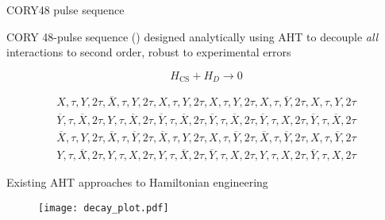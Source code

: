 \documentclass{beamer}
\begin{document}
\begin{frame}{CORY48 pulse sequence}
%

CORY 48-pulse sequence (\cite{CORY1990205}) designed analytically using AHT to decouple \emph{all} interactions to second order, robust to experimental errors

\[
H_{\text{CS}} + H_D \longrightarrow 0
\]

\begin{equation*}\label{eq:CORY48}
\begin{aligned}
    X, \tau, Y, 2\tau, \overline{X}, \tau, Y, 2\tau, X, \tau, Y, 2\tau,
    X, \tau, Y, 2\tau, X, \tau, \overline{Y}, 2\tau, X, \tau, Y, 2\tau \\
    \overline{Y}, \tau, \overline{X}, 2\tau, Y, \tau, \overline{X}, 2\tau,
    \overline{Y}, \tau, \overline{X}, 2\tau, \overline{Y}, \tau, \overline{X},
    2\tau, \overline{Y}, \tau, X, 2\tau, \overline{Y}, \tau, \overline{X},
    2\tau \\
    \overline{X}, \tau, Y, 2\tau, \overline{X}, \tau, \overline{Y}, 2\tau,
    \overline{X}, \tau, Y, 2\tau, X, \tau, \overline{Y}, 2\tau, \overline{X},
    \tau, \overline{Y}, 2\tau, X, \tau, \overline{Y}, 2\tau \\
    Y, \tau, \overline{X}, 2\tau, Y, \tau, X, 2\tau, Y, \tau, \overline{X}, 2\tau, \overline{Y}, \tau, X, 2\tau, Y, \tau, X, 2\tau, \overline{Y}, \tau, X, 2\tau
\end{aligned}
\end{equation*}

\end{frame}



\begin{frame}{Existing AHT approaches to Hamiltonian engineering}

\begin{figure}
\centering
\texttt{[image: decay\_plot.pdf]}
\end{figure}


\end{frame}
\end{document}
